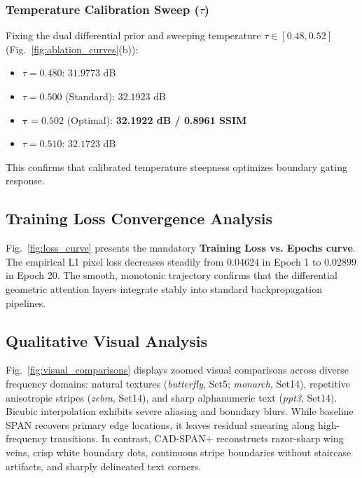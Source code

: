 \documentclass[conference]{IEEEtran}
\begin{document}
\subsubsection{Temperature Calibration Sweep ($\tau$)}
Fixing the dual differential prior and sweeping temperature $\tau \in [0.48, 0.52]$ (Fig.~\ref{fig:ablation_curves}(b)):
\begin{itemize}
    \item $\tau = 0.480$: $31.9773$ dB
    \item $\tau = 0.500$ (Standard): $32.1923$ dB
    \item $\mathbf{\tau = 0.502}$ (Optimal): \textbf{32.1922 dB / 0.8961 SSIM}
    \item $\tau = 0.510$: $32.1723$ dB
\end{itemize}
This confirms that calibrated temperature steepness optimizes boundary gating response.

\subsection{Training Loss Convergence Analysis}
Fig.~\ref{fig:loss_curve} presents the mandatory \textbf{Training Loss vs. Epochs curve}. The empirical L1 pixel loss decreases steadily from $0.04624$ in Epoch 1 to $0.02899$ in Epoch 20. The smooth, monotonic trajectory confirms that the differential geometric attention layers integrate stably into standard backpropagation pipelines.

\subsection{Qualitative Visual Analysis}

Fig.~\ref{fig:visual_comparisons} displays zoomed visual comparisons across diverse frequency domains: natural textures (\textit{butterfly}, Set5; \textit{monarch}, Set14), repetitive anisotropic stripes (\textit{zebra}, Set14), and sharp alphanumeric text (\textit{ppt3}, Set14). Bicubic interpolation exhibits severe aliasing and boundary blurs. While baseline SPAN recovers primary edge locations, it leaves residual smearing along high-frequency transitions. In contrast, CAD-SPAN+ reconstructs razor-sharp wing veins, crisp white boundary dots, continuous stripe boundaries without staircase artifacts, and sharply delineated text corners.
\end{document}
